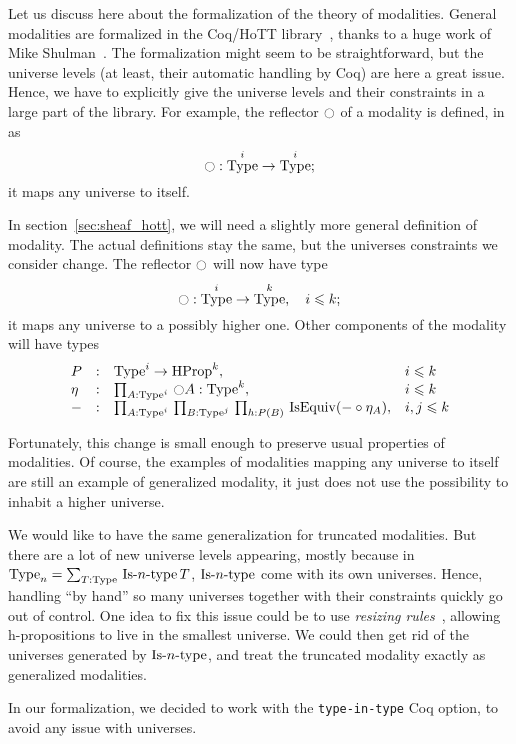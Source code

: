 \documentclass[notfinal]{jfrarticle}
\DeclareMathOperator{\Type}{Type}
\DeclareMathOperator{\HProp}{HProp}
\DeclareMathOperator{\IsEquiv}{IsEquiv}
\def\mymathhyphen{{\hbox{-}}}
\newcommand{\IsType}[1]
{\mathop{\mathrm{Is\mymathhyphen}#1\mathrm{\mymathhyphen type}} }
\newcommand{\modal}{\ensuremath{\ocircle}}
\newcommand{\sumD}[3]{\sum_{#1:#2}\, #3}
\newcommand{\prodD}[3]{\prod_{#1:#2}\, #3}
\newcommand{\code}[1]{\texttt{#1}}
\begin{document}
Let us discuss here about the formalization of the theory of
modalities. General modalities are formalized in the Coq/HoTT
library~\cite{hottlib}, thanks to a huge work of Mike
Shulman~\cite{modules-modalities}. The formalization might seem to be
straightforward, but the universe levels (at least, their automatic
handling by Coq) are here a great issue. Hence, we have to explicitly
give the universe levels and their constraints in a large part of the
library. For example, the reflector $\modal$ of a modality is defined,
in~\cite{hottlib} as
\[ \modal : \Type^i \to \Type^i ;\]
it maps any universe to itself.

In section~\ref{sec:sheaf_hott}, we will need a slightly more general
definition of modality. The actual definitions stay the same, but the
universes constraints we consider change. The reflector $\modal$ will
now have type
\[ \modal : \Type^i \to \Type^k,\quad i \leqslant k ;\]
it maps any universe to a possibly higher one.
Other components of the modality will have types
\[\begin{array}{llll}
  P &:& \Type^i \to \HProp^k, & i\leqslant k \\
  \eta &:& \prodD A {\Type^i} {\modal A : \Type^{k}}, & i \leqslant k\\
  - &:& \prodD A {\Type^i} {
          \prodD B {\Type^j} {
          \prodD h {P(B)} {
          \IsEquiv ( - \circ \eta_A)
          }}}, & i,j \leqslant k
\end{array}\]

Fortunately, this change is small enough to preserve usual properties of
modalities. Of course, the examples of modalities mapping
any universe to itself are still an example of generalized modality,
it just does not use the possibility to inhabit a higher
universe. 

We would like to have the same generalization for truncated
modalities. But there are a lot of new universe levels appearing,
mostly because in $\Type_n = \sumD T \Type {\IsType n T}$, $\IsType n$
come with its own universes. Hence, handling ``by hand'' so many
universes together with their constraints quickly go out of
control. One idea to fix this issue could be to use {\em resizing
  rules}~\cite{vv-resizing}, allowing h-propositions to live in the
smallest universe. We could then get rid of the universes generated by
$\IsType n$, and treat the truncated modality exactly as generalized
modalities.

In our formalization, we decided to work with the \code{type-in-type}
Coq option, to avoid any issue with universes.
\end{document}

